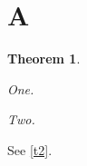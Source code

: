 \documentclass{amsart}
\newtheorem{thm}{Theorem}[section]
\begin{document}
\section{A}
\begin{thm}\label{t}
\begin{thmlist}
\item One.
\item\label{t2} Two.
\end{thmlist}
\end{thm}
See \cref{t2}.
\end{document}
